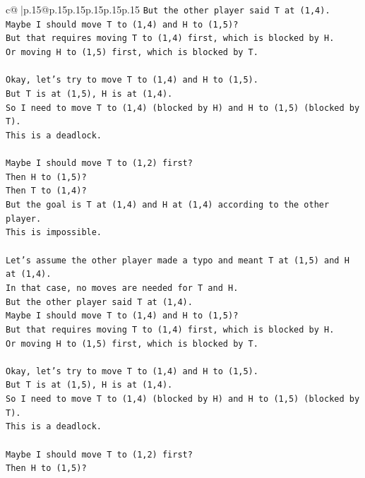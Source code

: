 \documentclass{article}
\begin{document}
{\begin{supertabular}{c@{$\;$}|p{.15\linewidth}@{}p{.15\linewidth}p{.15\linewidth}p{.15\linewidth}p{.15\linewidth}p{.15\linewidth}}
{{{\texttt{But the other player said T at (1,4).} \\
\texttt{Maybe I should move T to (1,4) and H to (1,5)?} \\
\texttt{But that requires moving T to (1,4) first, which is blocked by H.} \\
\texttt{Or moving H to (1,5) first, which is blocked by T.} \\
\\ 
\texttt{Okay, let's try to move T to (1,4) and H to (1,5).} \\
\texttt{But T is at (1,5), H is at (1,4).} \\
\texttt{So I need to move T to (1,4) (blocked by H) and H to (1,5) (blocked by T).} \\
\texttt{This is a deadlock.} \\
\\ 
\texttt{Maybe I should move T to (1,2) first?} \\
\texttt{Then H to (1,5)?} \\
\texttt{Then T to (1,4)?} \\
\texttt{But the goal is T at (1,4) and H at (1,4) according to the other player.} \\
\texttt{This is impossible.} \\
\\ 
\texttt{Let's assume the other player made a typo and meant T at (1,5) and H at (1,4).} \\
\texttt{In that case, no moves are needed for T and H.} \\
\texttt{But the other player said T at (1,4).} \\
\texttt{Maybe I should move T to (1,4) and H to (1,5)?} \\
\texttt{But that requires moving T to (1,4) first, which is blocked by H.} \\
\texttt{Or moving H to (1,5) first, which is blocked by T.} \\
\\ 
\texttt{Okay, let's try to move T to (1,4) and H to (1,5).} \\
\texttt{But T is at (1,5), H is at (1,4).} \\
\texttt{So I need to move T to (1,4) (blocked by H) and H to (1,5) (blocked by T).} \\
\texttt{This is a deadlock.} \\
\\ 
\texttt{Maybe I should move T to (1,2) first?} \\
\texttt{Then H to (1,5)?} \\
}}}
\end{supertabular}}
\end{document}
